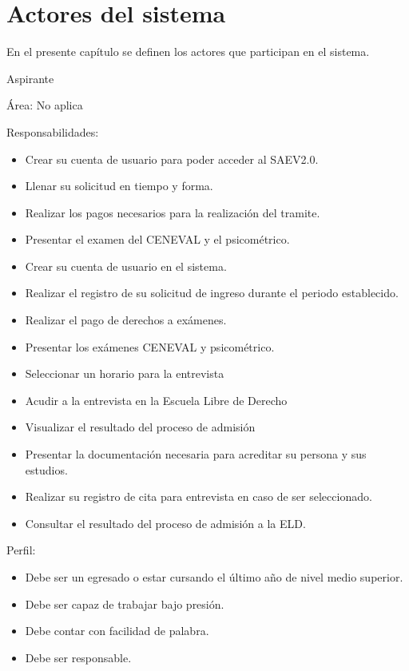 
\chapter{Actores del sistema}
\label{chapter:ActoresDelSistema}

En el presente capítulo se definen los actores que participan en el sistema.


\begin{Actor}{Aspirante}{}
	\item[Área:] No aplica
	\item[Responsabilidades:] \hspace{1pt}
	\begin{itemize}
		\item Crear su cuenta de usuario para poder acceder al SAEV2.0.
		\item Llenar su solicitud  en tiempo y forma.
		\item Realizar los pagos necesarios para la realización del tramite.
		\item Presentar el examen del CENEVAL y el psicométrico.
		\item Crear su cuenta de usuario en el sistema.
		\item Realizar el registro de su solicitud de ingreso durante el periodo establecido.
		\item Realizar el pago de derechos a exámenes.
		\item Presentar los exámenes CENEVAL y psicométrico.
		\item Seleccionar un horario para la entrevista
		\item Acudir a la entrevista en la Escuela Libre de Derecho
		\item Visualizar el resultado del proceso de admisión
        \item Presentar la documentación necesaria para acreditar su persona y sus estudios.
        \item Realizar su registro de cita para entrevista en caso de ser seleccionado.
        \item Consultar el resultado del proceso de admisión a la ELD.
	\end{itemize}
	\item[Perfil:] \hspace{1pt}
	\begin{itemize}
		\item Debe ser un egresado o estar cursando el último año de nivel medio superior. 
		\item Debe ser capaz de trabajar bajo presión.
		\item Debe contar con facilidad de palabra.
		\item Debe ser responsable.		
	\end{itemize}
\end{Actor}

